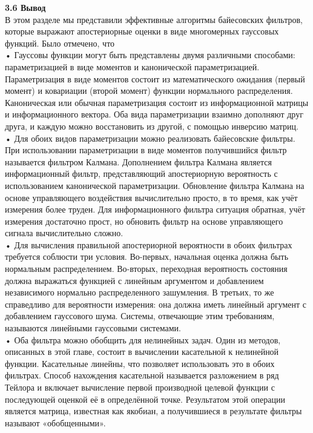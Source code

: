 \documentclass[10pt,a4paper]{article}
\begin{document}
\textbf{3.6 Вывод}\\

В этом разделе мы представили эффективные алгоритмы байесовских фильтров, которые выражают апостериорные оценки в виде многомерных гауссовых функций.  Было отмечено, что \\

• Гауссовы функции могут быть представлены двумя различными способами: параметризацией в виде моментов и канонической параметризацией. Параметризация в виде моментов состоит из математического ожидания (первый момент) и ковариации (второй момент) функции нормального распределения. Каноническая или обычная параметризация состоит из информационной матрицы и информационного вектора. Оба вида параметризации взаимно дополняют друг друга, и каждую можно восстановить из другой, с помощью инверсию матриц.\\

• Для обоих видов параметризации можно реализовать байесовские фильтры. При использовании параметризации в виде моментов получившийся фильтр называется фильтром Калмана. Дополнением фильтра Калмана является информационный фильтр, представляющий апостериорную вероятность с использованием канонической параметризации. Обновление фильтра Калмана на основе управляющего воздействия вычислительно просто, в то время, как учёт измерения более труден. Для информационного фильтра ситуация обратная, учёт измерения достаточно прост, но обновить фильтр на основе управляющего сигнала вычислительно сложно.\\

• Для вычисления правильной апостериорной вероятности в обоих фильтрах требуется соблюсти три условия. Во-первых, начальная оценка должна быть нормальным распределением. Во-вторых, переходная вероятность состояния должна выражаться функцией с линейным аргументом и добавлением независимого нормально распределенного зашумления. В третьих, то же справедливо для вероятности измерения: она должна иметь линейный аргумент с добавлением гауссового шума. Системы, отвечающие этим требованиям, называются линейными гауссовыми системами. \\

• Оба фильтра можно обобщить для нелинейных задач. Один из методов, описанных в этой главе, состоит в вычислении касательной к нелинейной функции. Касательные линейны, что позволяет использовать это в обоих фильтрах. Способ нахождения касательной называется разложением в ряд Тейлора и включает вычисление первой производной целевой функции с последующей оценкой её в определённой точке. Результатом этой операции является матрица, известная как якобиан, а получившиеся в результате фильтры называют «обобщенными».  
\end{document}

